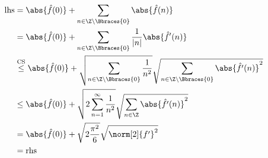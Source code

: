 \begin{solution}
\begin{enumerate}[label = \arabic*.]
    \begin{align*}
        \mathrm{lhs}
        & =
        \abs{\hat f(0)}
        +
        \sum_{n \in \Z \setminus \Bbraces{0}}
        \abs{\hat f(n)} \\
        & =
        \abs{\hat f(0)}
        +
        \sum_{n \in \Z \setminus \Bbraces{0}}
        \frac{1}{|n|}
        \abs{\hat f^\prime(n)} \\
        & \stackrel
        {
            \mathrm{CS}
        }{\leq}
        \abs{\hat f(0)}
        +
        \sqrt
        {
            \sum_{n \in \Z \setminus \Bbraces{0}}
            \frac{1}{n^2}
        }
        \sqrt
        {
            \sum_{n \in \Z \setminus \Bbraces{0}}
            \abs{\hat f^\prime(n)}^2
        } \\
        & \leq
        \abs{\hat f(0)}
        +
        \sqrt
        {
            2 \sum_{n=1}^\infty
            \frac{1}{n^2}
        }
        \sqrt
        {
            \sum_{n \in \Z}
            \abs{\hat f^\prime(n)}^2
        } \\
        & =
        \abs{\hat f(0)}
        +
        \sqrt
        {
            2
            \frac{\pi^2}{6}
        }
        \sqrt
        {
            \norm[2]{f^\prime}^2
        } \\
        & =
        \mathrm{rhs}
    \end{align*}

\end{enumerate}

\end{solution}

